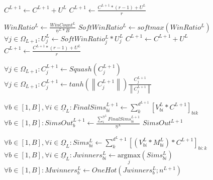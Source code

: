 {\begin{algorithm}[h]
\begin{algorithmic}[1]

            \State $C^{L+1} \gets C^{L+1} + U^L$
            \State $C^{L+1} \gets \frac{C^{L+1} \ast (r-1) + U^L}{r}$ 
          \EndIf

          \Else
            \State $WinRatio^L \gets \frac{WinCount^L}{\underline{n}^L \ast B}$
            \State $SoftWinRatio^L \gets softmax(WinRatio^L)$
            \State $\forall j \in \Omega_{L+1}: U^L_j \gets SoftWinRatio_j^L \ast U^L_j$
              \State $C^{L+1} \gets C^{L+1} + U^L$
              \State $C^{L+1} \gets \frac{C^{L+1} \ast (r-1) + U^L}{r}$
            \EndIf
        \EndIf

            \State $\forall j \in \Omega_{L+1}: C_j^{L+1} \gets Squash(C_j^{L+1})$
          \Else
            \State $\forall j \in \Omega_{L+1}: C_j^{L+1} \gets tanh(\left\lVert C_j^{L+1}\right\rVert ) \frac{C_j^{L+1}}{\left\lVert C_j^{L+1}\right\rVert }$
          \EndIf
        \EndIf

      \EndFor
      


      \State $\forall b \in [1,B], \forall i \in \underline{\Omega}_L: FinalSims^{L+1}_{bi} \gets \sum_k^{d^{L+1}} [V^L_{bi} \ast C^{L+1}]_{bik}$
      \State {}
      \State $\forall b \in [1,B]: SimsOut_b^{L+1} \gets \frac{\sum_i^{\underline{n}^L} FinalSims^{L+1}_{bi}}{\underline{n}^L}$
      \State \Return $SimsOut^{L+1}$ 
    \EndProcedure
  \end{algorithmic}
  \end{algorithm}

\begin{algorithm}
  \begin{algorithmic}
      \ForAll{$\theta \in \Theta$}
            \State $\forall b \in [1,B], \forall i \in \underline{\Omega}_L: Sims^L_{bi} \gets \sum_k^{d^L+1} [(V^L_{bi} \ast M^L_{bi}) \ast C^{L+1}]_{bi:k}$
            \State {}
              \State $\forall b \in [1,B], \forall i \in \underline{\Omega}_L: Jwinners^L_{bi} \gets \underset{j}{\mathrm{argmax}}(Sims^L_{bi})$
              \State {}
              \State $\forall b \in [1,B]: Mwinners^L_b \gets OneHot(Jwinners^L_{b};n^{L+1})$
              

\end{algorithmic}
\end{algorithm}}
